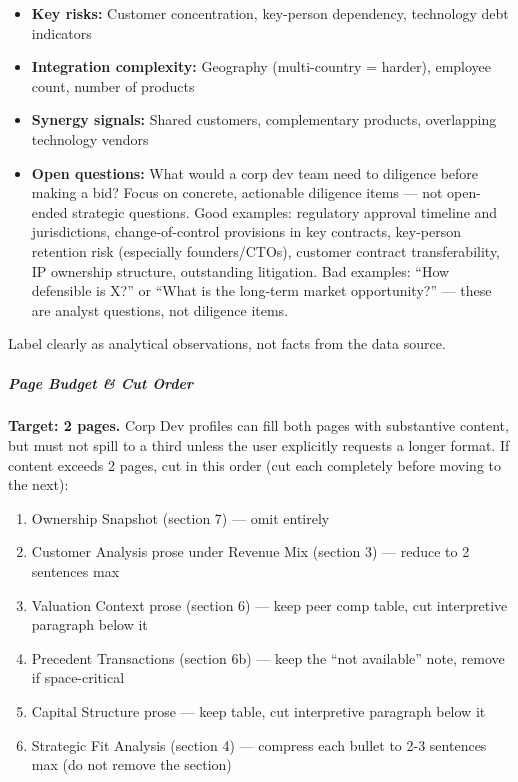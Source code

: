 \documentclass[11pt]{article}
\begin{document}
\begin{itemize}[leftmargin=*,itemsep=2pt,topsep=2pt]
\item {} \textbf{Key risks:} Customer concentration, key-person dependency, technology debt indicators
\item {} \textbf{Integration complexity:} Geography (multi-country = harder), employee count, number of products
\item {} \textbf{Synergy signals:} Shared customers, complementary products, overlapping technology vendors
\item {} \textbf{Open questions:} What would a corp dev team need to diligence before making a bid? Focus on concrete, actionable diligence items — not open-ended strategic questions. Good examples: regulatory approval timeline and jurisdictions, change-of-control provisions in key contracts, key-person retention risk (especially founders/CTOs), customer contract transferability, IP ownership structure, outstanding litigation. Bad examples: ``How defensible is X?'' or ``What is the long-term market opportunity?'' — these are analyst questions, not diligence items.
\end{itemize}

Label clearly as analytical observations, not facts from the data source.


\subparagraph{Page Budget \& Cut Order}\mbox{}\par

\textbf{Target: 2 pages.} Corp Dev profiles can fill both pages with substantive content, but must not spill to a third unless the user explicitly requests a longer format. If content exceeds 2 pages, cut in this order (cut each completely before moving to the next):


\begin{enumerate}[leftmargin=*,itemsep=2pt,topsep=2pt]
\item {} Ownership Snapshot (section 7) — omit entirely
\item {} Customer Analysis prose under Revenue Mix (section 3) — reduce to 2 sentences max
\item {} Valuation Context prose (section 6) — keep peer comp table, cut interpretive paragraph below it
\item {} Precedent Transactions (section 6b) — keep the ``not available'' note, remove if space-critical
\item {} Capital Structure prose — keep table, cut interpretive paragraph below it
\item {} Strategic Fit Analysis (section 4) — compress each bullet to 2-3 sentences max (do not remove the section)
\end{enumerate}
\end{document}
